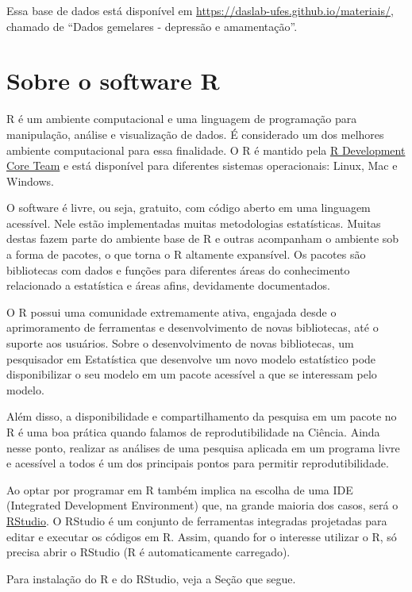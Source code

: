 \documentclass[
]{book}
\begin{document}
Essa base de dados está disponível em \url{https://daslab-ufes.github.io/materiais/}, chamado de ``Dados gemelares - depressão e amamentação''.

\hypertarget{sobre-o-software-r}{%
\section{Sobre o software R}\label{sobre-o-software-r}}

R é um ambiente computacional e uma linguagem de programação para manipulação, análise e visualização de dados. É considerado um dos melhores ambiente computacional para essa finalidade. O R é mantido pela \href{https://cran.r-project.org/}{R Development Core Team} e está disponível para diferentes sistemas operacionais: Linux, Mac e Windows.

O software é livre, ou seja, gratuito, com código aberto em uma linguagem acessível. Nele estão implementadas muitas metodologias estatísticas. Muitas destas fazem parte do ambiente base de R e outras acompanham o ambiente sob a forma de pacotes, o que torna o R altamente expansível. Os pacotes são bibliotecas com dados e funções para diferentes áreas do conhecimento relacionado a estatística e áreas afins, devidamente documentados.

O R possui uma comunidade extremamente ativa, engajada desde o aprimoramento de ferramentas e desenvolvimento de novas bibliotecas, até o suporte aos usuários. Sobre o desenvolvimento de novas bibliotecas, um pesquisador em Estatística que desenvolve um novo modelo estatístico pode disponibilizar o seu modelo em um pacote acessível a que se interessam pelo modelo.

Além disso, a disponibilidade e compartilhamento da pesquisa em um pacote no R é uma boa prática quando falamos de reprodutibilidade na Ciência. Ainda nesse ponto, realizar as análises de uma pesquisa aplicada em um programa livre e acessível a todos é um dos principais pontos para permitir reprodutibilidade.

Ao optar por programar em R também implica na escolha de uma IDE (Integrated Development Environment) que, na grande maioria dos casos, será o \href{https://rstudio.com}{RStudio}. O RStudio é um conjunto de ferramentas integradas projetadas para editar e executar os códigos em R. Assim, quando for o interesse utilizar o R, só precisa abrir o RStudio (R é automaticamente carregado).

Para instalação do R e do RStudio, veja a Seção que segue.
\end{document}
